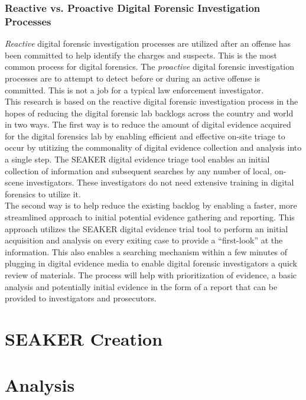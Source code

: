 \documentclass[12pt]{article}
\begin{document}
\subsubsection{Reactive vs. Proactive Digital Forensic Investigation Processes}
\vspace{0.5 cm}
\textit{Reactive} digital forensic investigation processes are utilized after an offense has been committed to help
identify the charges and suspects.  This is the most common process for digital forensics.  The \textit{proactive}
digital forensic investigation processes are to attempt to detect before or during an active offense is committed.
This is not a job for a typical law enforcement investigator.\\

This research is based on the reactive digital forensic investigation process in the hopes of reducing the digital
forensic lab backlogs across the country and world in two ways.  The first way is to reduce the amount of digital
evidence acquired for the digital forensics lab by enabling efficient and effective on-site triage to occur by
utitizing the commonality of digital evidence collection and analysis into a single step.  The SEAKER digital
evidence triage tool enables an initial collection of information and subsequent searches by any number of local,
on-scene investigators.  These investigators do not need extensive training in digital forensics to utilize it.\\

The second way is to help reduce the existing backlog by enabling a faster, more streamlined approach to initial
potential evidence gathering and reporting.  This approach utilizes the SEAKER digital evidence trial tool to 
perform an initial acquisition and analysis on every exiting case to provide a ``first-look'' at the information.  This
also enables a searching mechanism within a few minutes of plugging in digital evidence media to enable digital 
forensic investigators a quick review of materials.  The process will help with prioritization of evidence, a basic
analysis and potentially initial evidence in the form of a report that can be provided to investigators and
prosecutors.\\

\section{SEAKER Creation}
\label{sect-Creation}

\section{Analysis}
\label{sect-analysis}
\end{document}
